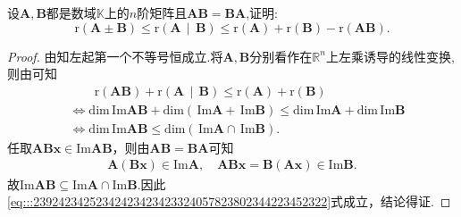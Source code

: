 \documentclass[../../main.tex]{subfiles}%
\begin{document}
\begin{proposition}\label{proposition:矩阵乘法可交换诱导的秩不等式}
设\(\boldsymbol{A},\boldsymbol{B}\)都是数域\(\mathbb{K}\)上的\(n\)阶矩阵且\(\boldsymbol{A}\boldsymbol{B}=\boldsymbol{B}\boldsymbol{A}\),证明:
\[
\mathrm{r}\left( \boldsymbol{A}\pm \boldsymbol{B} \right) \leqslant \mathrm{r}\left( \boldsymbol{A}\,\mid \,\boldsymbol{B} \right) \leqslant \mathrm{r}\left( \boldsymbol{A} \right) +\mathrm{r}\left( \boldsymbol{B} \right) -\mathrm{r}\left( \boldsymbol{AB} \right) .
\]
\end{proposition}
\begin{proof}
由知左起第一个不等号恒成立.将$\boldsymbol{A},\boldsymbol{B}$分别看作在$\mathbb{R} ^n$上左乘诱导的线性变换,则由可知
\begin{align}
&\quad \quad \mathrm{r}\left( \boldsymbol{AB} \right) +\mathrm{r}\left( \boldsymbol{A}\,\mid \,\boldsymbol{B} \right) \leqslant \mathrm{r}\left( \boldsymbol{A} \right) +\mathrm{r}\left( \boldsymbol{B} \right) 
\nonumber \\
&\Longleftrightarrow \mathrm{dim}\,\mathrm{Im}\boldsymbol{AB}+\mathrm{dim}\left( \,\mathrm{Im}\boldsymbol{A}+\,\mathrm{Im}\boldsymbol{B} \right) \leqslant \mathrm{dim}\,\mathrm{Im}\boldsymbol{A}+\mathrm{dim}\,\mathrm{Im}\boldsymbol{B}
\nonumber \\
&\Longleftrightarrow \mathrm{dim}\,\mathrm{Im}\boldsymbol{AB}\leqslant \mathrm{dim}\left( \,\mathrm{Im}\boldsymbol{A}\cap \,\mathrm{Im}\boldsymbol{B} \right) .\label{eq:::23924234252342423423423324057823802344223452322}
\end{align}
任取$\boldsymbol{ABx}\in \mathrm{Im}\boldsymbol{AB}$，则由$\boldsymbol{AB}=\boldsymbol{BA}$可知
\begin{align*}
\boldsymbol{A}\left( \boldsymbol{Bx} \right) \in \mathrm{Im}\boldsymbol{A},\quad \boldsymbol{ABx}=\boldsymbol{B}\left( \boldsymbol{Ax} \right) \in \mathrm{Im}\boldsymbol{B}.
\end{align*}
故$\mathrm{Im}\boldsymbol{AB}\subseteq \mathrm{Im}\boldsymbol{A}\cap \mathrm{Im}\boldsymbol{B}$.因此\eqref{eq:::23924234252342423423423324057823802344223452322}式成立，结论得证.
\end{proof}
\end{document}
